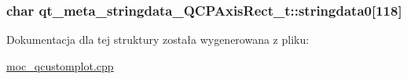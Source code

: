 \subsubsection[{\texorpdfstring{stringdata0}{stringdata0}}]{\setlength{\rightskip}{0pt plus 5cm}char qt\+\_\+meta\+\_\+stringdata\+\_\+\+Q\+C\+P\+Axis\+Rect\+\_\+t\+::stringdata0\mbox{[}118\mbox{]}}\hypertarget{structqt__meta__stringdata___q_c_p_axis_rect__t_a7263fed0445758459e2610e1b9fffe05}{}\label{structqt__meta__stringdata___q_c_p_axis_rect__t_a7263fed0445758459e2610e1b9fffe05}


Dokumentacja dla tej struktury została wygenerowana z pliku\+:\begin{DoxyCompactItemize}
\item 
\hyperlink{moc__qcustomplot_8cpp}{moc\+\_\+qcustomplot.\+cpp}\end{DoxyCompactItemize}
